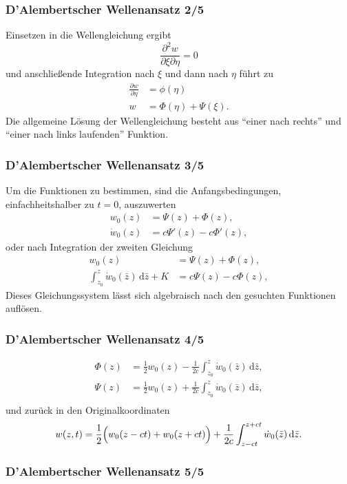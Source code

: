 \documentclass[hyperref={pdfpagemode=FullScreen, colorlinks=false}]{beamer}
\begin{document}
\begin{frame}
\frametitle{D'Alembertscher Wellenansatz 2/5}
Einsetzen in die Wellengleichung ergibt
\begin{equation*}
 \frac{\partial^2 w}{\partial \xi \partial \eta}=0
\end{equation*}
und anschließende Integration nach $\xi$ und dann nach $\eta$ führt zu
\begin{align*}
 \frac{\partial w}{\partial \eta} &= \phi(\eta) \\
 w&=\Phi(\eta) + \Psi(\xi).
\end{align*}
Die allgemeine Lösung der Wellengleichung besteht aus ``einer nach rechts'' und ``einer nach links laufenden'' Funktion. 
\end{frame}

\begin{frame}
\frametitle{D'Alembertscher Wellenansatz 3/5}
Um die Funktionen zu bestimmen, sind die Anfangsbedingungen, einfachheitshalber zu $t=0$, auszuwerten
\begin{align*}
 w_0(z)&=\Psi(z)+\Phi(z),\\
 \dot{w}_0(z)&=c\Psi'(z)-c\Phi'(z),
\end{align*}
oder nach Integration der zweiten Gleichung
\begin{align*}
 w_0(z)&=\Psi(z)+\Phi(z),\\
 \int_{z_0}^z  \dot{w}_0(\bar{z})\,\mathrm{d}\bar{z}+K&=c\Psi(z)-c\Phi(z),
\end{align*}
Dieses Gleichungssystem lässt sich algebraisch nach den gesuchten Funktionen auflösen.
\end{frame}

\begin{frame}
\frametitle{D'Alembertscher Wellenansatz 4/5}
\begin{align*}
 \Phi(z)&=\frac{1}{2}w_0(z)-\frac{1}{2c} \int_{z_0}^z  \dot{w}_0(\bar{z})\,\mathrm{d}\bar{z},\\
 \Psi(z)&=\frac{1}{2}w_0(z)+\frac{1}{2c} \int_{z_0}^z  \dot{w}_0(\bar{z})\,\mathrm{d}\bar{z},\\
\end{align*}
und zurück in den Originalkoordinaten
\begin{equation*}
 w(z,t)=\frac{1}{2}\Bigl( w_0(z-ct) + w_0(z+ct) \Bigr)+\frac{1}{2c} \int_{z-ct}^{z+ct}  \dot{w}_0(\bar{z})\,\mathrm{d}\bar{z}.
\end{equation*}
\end{frame}

\begin{frame}
\frametitle{D'Alembertscher Wellenansatz 5/5}



\end{frame}
\end{document}
